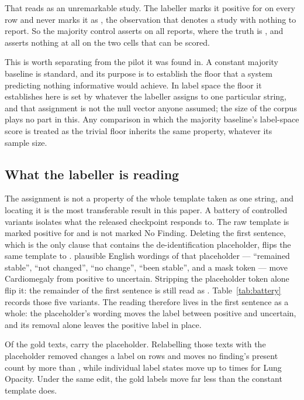 \begin{quote}
\small\itshape \MajTemplate{}
\end{quote}

That reads as an unremarkable study. The labeller marks it positive for
\MajAsserted{} on every row and never marks it as \ScoredTwo{}, the observation
that denotes a study with nothing to report. So the majority control asserts
\MajAsserted{} on all \NCohort{} reports, where the truth is
\MajAssertedDrawn{}, and asserts nothing at all on the two cells that can be
scored.

This is worth separating from the pilot it was found in. A constant majority
baseline is standard, and its purpose is to establish the floor that a system
predicting nothing informative would achieve. In label space the floor it
establishes here is set by whatever the labeller assigns to one particular
string, and that assignment is not the null vector anyone assumed; the size of
the corpus plays no part in this. Any comparison in which the majority
baseline's label-space score is treated as the trivial floor inherits the same
property, whatever its sample size.

\subsection{What the labeller is reading}

The assignment is not a property of the whole template taken as one string,
and locating it is the most transferable result in this paper. A battery of
\BatteryN{} controlled variants isolates what the released checkpoint responds
to. The raw template is marked positive for \BatteryRawPositive{} and is not
marked No Finding. Deleting the first sentence, which is the only clause that
contains the de-identification placeholder, flips the same template to
\BatteryMinusFirst{}. \BatteryPlausibleUncertain{} plausible English wordings
of that placeholder --- ``remained stable'', ``not changed'', ``no change'',
``been stable'', and a mask token --- move Cardiomegaly from positive to
uncertain. Stripping the placeholder token alone \BatteryPlaceholderFlips{}
flip it: the remainder of the first sentence is still read as
\BatteryRawPositive{}. Table~\ref{tab:battery} records those five variants.
The reading therefore lives in the first sentence as a whole: the
placeholder's wording moves the label between positive and uncertain, and its
removal alone leaves the positive label in place.

Of the gold texts, \GoldPlaceholderTexts{} carry the placeholder. Relabelling
those texts with the placeholder removed changes a label on \GoldRowsChanged{}
rows and moves no finding's present count by more than
\GoldMaxDeltaPresent{}, while individual label states move up to
\GoldLungOpacityAnyState{} times for Lung Opacity. Under the same edit, the
gold labels move far less than the constant template does.

